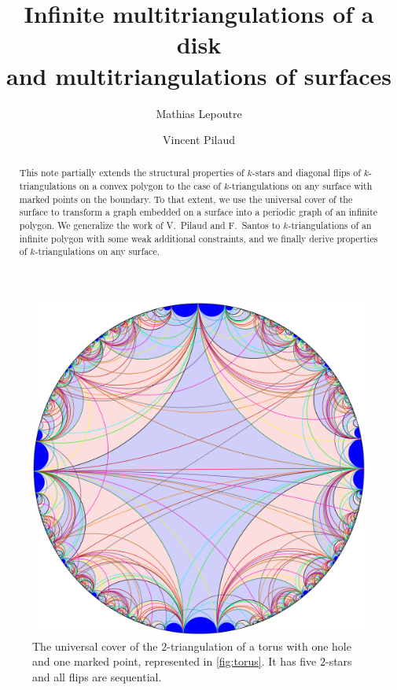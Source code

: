 \documentclass{amsart}
\title[Infinite multitriangulations of a disk and multitriangulations of surfaces]{Infinite multitriangulations of a disk \\ and multitriangulations of surfaces}
\author{Mathias Lepoutre}
\author{Vincent Pilaud}
\theoremstyle{remark}
\begin{document}
\begin{abstract}
This note partially extends the structural properties of $k$-stars and diagonal flips of $k$-triangulations on a convex polygon to the case of $k$-triangulations on any surface with marked points on the boundary. 
To that extent, we use the universal cover of the surface to transform a graph embedded on a surface into a periodic graph of an infinite polygon.
We generalize the work of V.~Pilaud and F.~Santos to $k$-triangulations of an infinite polygon with some weak additional constraints, and we finally derive properties of $k$-triangulations on any surface.
\end{abstract}

\maketitle

\begin{figure}[h]
	\capstart
	\centerline{\includegraphics[scale=.42]{torus}}
	\caption{The universal cover of the $2$-triangulation of a torus with one hole and one marked point, represented in \cref{fig:torus}. It has five $2$-stars and all flips are sequential.}
	\label{fig:UCtorus}
\end{figure}
\end{document}
